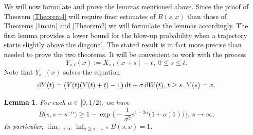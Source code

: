 \documentclass[sn-mathphys-num]{sn-jnl}
\newtheorem{lem}[thm]{Lemma}
\theoremstyle{definition}
\newcommand{\scr}[1]{\mathscr #1}
\numberwithin{equation}{section} \theoremstyle{remark}
\renewcommand{\d}{\hbox{d}}
\def\d{\text{\rm{d}}} \def\bb{\beta} \def\aa{\alpha} \def\D{\scr D}
\newcommand{\1}{\mathbbm{1}}
\begin{document}
    
We will now formulate and prove the lemmas mentioned above. Since the proof of Theorem \ref{Theorem4} will require finer estimates of $B(s,x)$ than those of Theorems \ref{1main} and \ref{Theorem2} we will
formulate the lemmas accordingly. The first
lemma provides a lower bound for the blow-up probability when a trajectory starts slightly above the diagonal. The stated result is in fact more precise than needed to prove the two theorems. It will  be convenient to work with the process
$$
Y_{s,t}(x):=X_{s,t}(x+s)-t,\;0\leq s\leq t.
$$
Note that $Y_{s,.}(x)$ solves the equation
\begin{equation}\label{why}
\d Y(t)=\big(Y(t) (Y(t) +t)-1     \big)\,\d t +\sigma\,\d W(t), \,t\geq s,\,Y(s)=x.
\end{equation}





\begin{lem}\label{lemma}
For each  $\alpha \in [0,1/2)$, we have
$$
B\big(s,s+s^{-\alpha}\big)\geq 1 - \exp\Big\{ -\frac 1{\sigma^2}s^{1-2\alpha}\big(1+o(1)\big)\Big\},\,s \to\infty.
$$
In particular, $\lim_{s \to \infty}\inf_{x \geq s+s^{-\alpha}}B(s,x)=1$.
\end{lem}
\end{document}
